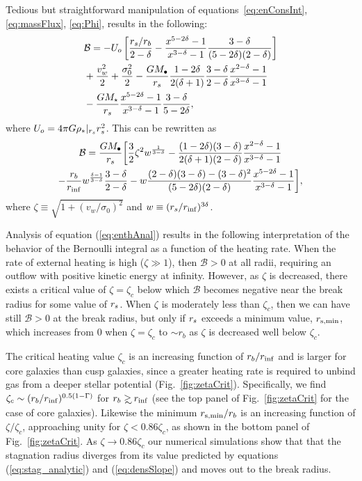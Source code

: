 Tedious but straightforward manipulation of equations~\eqref{eq:enConsInt}, \eqref{eq:massFlux}, \eqref{eq:Phi}, results in the following:
\begin{align}
  &\mathcal{B} = -U_o\left[\frac{r_s/r_b}{2-\delta}-\frac{x^{5-2\delta}-1}{x^{3-\delta}-1}\frac{3-\delta}{(5-2\delta)(2-\delta)}\right]\nonumber\\
  &+\frac{v_w^2}{2}+\frac{\sigma_0^2}{2}- \frac{G M_{\bullet}}{r_s}
  \frac{1-2\delta}{2(\delta+1)}
  \frac{3-\delta}{2-\delta}\frac{x^{2-\delta}-1}{x^{3-\delta}-1}
  \nonumber\\
  &-\frac{G M_\star}{r_s}
  \frac{x^{5-2\delta}-1}{x^{3-\delta}-1}\frac{3-\delta}{5-2\delta},
\end{align}
where $U_o=4 \pi G \rho_*|_{r_s} r_s^2$.  This can be rewritten as
\begin{multline}
  \mathcal{B} =\frac{G M_{\bullet}}{r_s} \biggl[ \frac{3}{2} \zeta^2
  w^{\frac{1}{3 -\delta}}
  -\frac{(1-2\delta)(3-\delta)}{2(\delta+1)(2-\delta)}  \frac{x^{2  -\delta}-1}{x^{3-\delta}-1}\\
  -\frac{r_b}{r_{\rm inf}} w^{\frac{\delta-1}{3-\delta}} \frac{3 -\delta}{2
    -\delta} -w
  \frac{(2-\delta)(3-\delta)-(3-\delta)^{2}}{(5-2\delta)(2-\delta)}
  \frac{x^{5-2\delta}-1}{x^{3-\delta}-1} \biggr],
\label{eq:enthAnal}
\end{multline}
where $\zeta \equiv \sqrt{1 + (v_w/\sigma_0)^2}$ and $w\equiv
(r_s/r_{\rm inf})^{3\delta}$.

Analysis of equation (\ref{eq:enthAnal}) results in the following
interpretation of the behavior of the Bernoulli integral as a function
of the heating rate.  When the rate of external heating is high
($\zeta \gg 1$), then $\mathcal{B} > 0$ at all radii, requiring an
outflow with positive kinetic energy at infinity.  However, as $\zeta$
is decreased, there exists a critical value of $\zeta = \zeta_{c}$
below which $\mathcal{B}$ becomes negative near the break radius for
some value of $r_s$.  When $\zeta$ is moderately less than $\zeta_c$,
then we can have still $\mathcal{B} > 0$ at the break radius, but only
if $r_s$ exceeds a minimum value, $r_{\rm s,min}$, which increases
from 0 when $\zeta = \zeta_c$ to $\sim r_{b}$ as $\zeta$ is decreased
well below $\zeta_c$.

The critical heating value $\zeta_c$ is an increasing function of
$r_{b}/r_{\rm inf}$ and is larger for core galaxies than cusp
galaxies, since a greater heating rate is required to unbind gas from
a deeper stellar potential (Fig.~\ref{fig:zetaCrit}).  Specifically,
we find $\zeta_c\sim (r_b/r_{\rm inf})^{0.5(1-\Gamma)}$ for $\rb\gsim\rinf$
(see the top panel of Fig.~\ref{fig:zetaCrit} for the case of core
galaxies). Likewise the minimum $r_{\rm s,min}/r_{b}$ is an increasing
function of $\zeta/\zeta_{c}$, approaching unity for $\zeta <
0.86\zeta_c$, as shown in the bottom panel of Fig.~\ref{fig:zetaCrit}.
As $\zeta \rightarrow 0.86\zeta_c$ our numerical simulations show that
that the stagnation radius diverges from its value predicted by
equations (\ref{eq:stag_analytic}) and (\ref{eq:densSlope}) and moves
out to the break radius.


